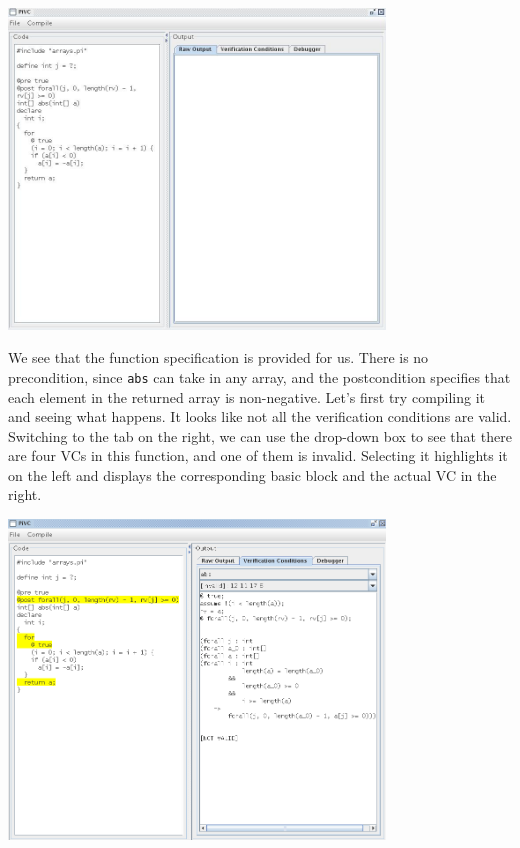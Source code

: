 \documentclass{article}
\begin{document}
\begin{center}\includegraphics[width=100mm]{pivc1}\end{center}

We see that the function specification is provided for us.  There is no precondition, since \texttt{abs} can take in any array, and the postcondition specifies that each element in the returned array is non-negative.  Let's first try compiling it and seeing what happens.  It looks like not all the verification conditions are valid.  Switching to the tab on the right, we can use the drop-down box to see that there are four VCs in this function, and one of them is invalid.  Selecting it highlights it on the left and displays the corresponding basic block and the actual VC in the right.

\begin{center}\includegraphics[width=100mm]{pivc2}\end{center}
\end{document}
